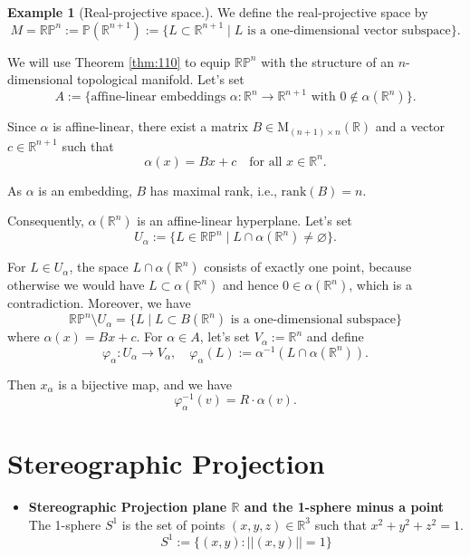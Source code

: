 \documentclass[
]{book}
\providecommand{\tightlist}{%
  \setlength{\itemsep}{0pt}\setlength{\parskip}{0pt}}
\theoremstyle{definition}
\theoremstyle{definition}
\newtheorem{example}{Example}[chapter]
\theoremstyle{definition}
\theoremstyle{definition}
\theoremstyle{remark}
\begin{document}
\begin{example}[Real-projective space.]
\protect\hypertarget{exm:unnamed-chunk-21}{}\label{exm:unnamed-chunk-21}We define the real-projective space by
\[ M = \mathbb{RP}^n := \mathbb{P}(\mathbb{R}^{n+1}) := \{ L \subset \mathbb{R}^{n+1} \mid L \text{ is a one-dimensional vector subspace} \}. \]

We will use Theorem \ref{thm:110} to equip \(\mathbb{RP}^n\) with the structure of an \(n\)-dimensional topological manifold. Let's set
\[ A := \{ \text{affine-linear embeddings } \alpha : \mathbb{R}^n \to \mathbb{R}^{n+1} \text{ with } 0 \notin \alpha(\mathbb{R}^n) \}. \]

Since \(\alpha\) is affine-linear, there exist a matrix \(B \in \text{M}_{(n+1) \times n} (\mathbb{R})\) and a vector \(c \in \mathbb{R}^{n+1}\) such that
\[ \alpha(x) = Bx + c \quad \text{for all } x \in \mathbb{R}^n. \]

As \(\alpha\) is an embedding, \(B\) has maximal rank, i.e., \(\text{rank}(B) = n\).

Consequently, \(\alpha(\mathbb{R}^n)\) is an affine-linear hyperplane. Let's set
\[ U_\alpha := \{ L \in \mathbb{RP}^n \mid L \cap \alpha(\mathbb{R}^n) \neq \varnothing \}. \]

For \(L \in U_\alpha\), the space \(L \cap \alpha(\mathbb{R}^n)\) consists of exactly one point, because otherwise we would have \(L \subset \alpha(\mathbb{R}^n)\) and hence \(0 \in \alpha(\mathbb{R}^n)\), which is a contradiction. Moreover, we have
\[ \mathbb{RP}^n \setminus U_\alpha = \{ L \mid L \subset B(\mathbb{R}^n) \text{ is a one-dimensional subspace} \} \]
where \(\alpha(x) = Bx + c\). For \(\alpha \in A\), let's set \(V_\alpha := \mathbb{R}^n\) and define
\[ \varphi_\alpha : U_\alpha \to V_\alpha, \quad \varphi_\alpha(L) := \alpha^{-1}(L \cap \alpha(\mathbb{R}^n)). \]

Then \(x_\alpha\) is a bijective map, and we have
\[ \varphi_\alpha^{-1}(v) = R \cdot \alpha(v). \]
\end{example}

\hypertarget{appendix-appendix}{%
\appendix}


\hypertarget{stereographic-projection}{%
\chapter{Stereographic Projection}\label{stereographic-projection}}

\begin{itemize}
\tightlist
\item
  \textbf{Stereographic Projection plane \(\mathbb{R}\) and the 1-sphere minus a point}\\
  The 1-sphere \(S^1\) is the set of points \((x,y,z) \in \mathbb{R}^3\) such that \(x^2 + y^2 + z^2 = 1\).
  \[S^1:=\{(x,y): ||(x,y)||=1\}\]
\end{itemize}
\end{document}
